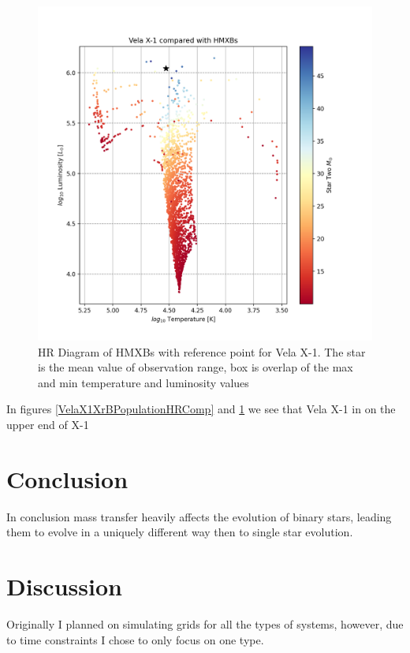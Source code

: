 \documentclass[12pt, a4paper]{article}
\begin{document}
            \begin{figure}[H] 
                \centering
                \includegraphics[scale = .6]{figs/GeneratedFigs/VelaX-1/VelaX1HMXBPopulationHRComp.png}
                \caption{HR Diagram of HMXBs with reference point for Vela X-1. The star is the mean value of observation range, box is overlap of the max and min temperature and luminosity values}
                \label{VelaX1HMXBPopulationHRComp}
            \end{figure}


            In figures \ref{VelaX1XrBPopulationHRComp} and \ref{VelaX1HMXBPopulationHRComp} we see that Vela X-1 in on the upper end of X-1 

\section{\centering Conclusion}
    In conclusion mass transfer heavily affects the evolution of binary stars, leading them to evolve in a uniquely different way then to single star evolution. 

\section{\centering Discussion}   
    Originally I planned on simulating grids for all the types of systems, however, due to time constraints I chose to only focus on one type. 
\end{document}
